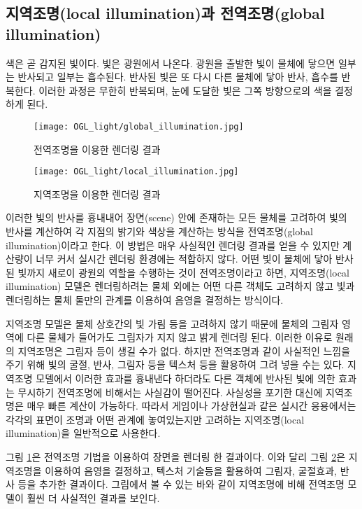 \subsection{지역조명(local illumination)과 전역조명(global illumination)}

색은 곧 감지된 빛이다. 빛은 광원에서 나온다. 광원을 출발한 빛이 물체에 닿으면 일부는 반사되고 일부는 흡수된다. 반사된 빛은 또 다시 다른 물체에 닿아 반사, 흡수를 반복한다. 이러한 과정은 무한히 반복되며, 눈에 도달한 빛은 그쪽 방향으로의 색을 결정하게 된다.


\begin{figure}[h!]
  \centering
    \texttt{[image: OGL\_light/global\_illumination.jpg]}
    \caption{전역조명을 이용한 렌더링 결과}
    \label{fig:OGL_light:global_illumination}
\end{figure}

\begin{figure}[h!]
  \centering
    \texttt{[image: OGL\_light/local\_illumination.jpg]}
    \caption{지역조명을 이용한 렌더링 결과}
    \label{fig:OGL_light:local_illumination}
\end{figure}

이러한 빛의 반사를 흉내내어 장면(scene) 안에 존재하는 모든 물체를 고려하여 빛의 반사를 계산하여 각 지점의 밝기와 색상을 계산하는 방식을 전역조명(global illumination)이라고 한다. 이 방법은 매우 사실적인 렌더링 결과를 얻을 수 있지만 계산량이 너무 커서 실시간 렌더링 환경에는 적합하지 않다.
어떤 빛이 물체에 닿아 반사된 빛까지 새로이 광원의 역할을 수행하는 것이 전역조명이라고 하면, 지역조명(local illumination) 모델은 렌더링하려는 
물체 외에는 어떤 다른 객체도 고려하지 않고 빛과 렌더링하는 물체 둘만의 관계를 이용하여 음영을 결정하는 방식이다. 


지역조명 모델은 물체 상호간의 빛 가림 등을 고려하지 않기 때문에 물체의 그림자 영역에 다른 물체가 들어가도 그림자가 지지 않고 밝게 렌더링 된다. 
이러한 이유로 원래의 지역조명은 그림자 등이 생길 수가 없다.
하지만 전역조명과 같이 사실적인 느낌을 주기 위해 빛의 굴절, 반사, 그림자 등을 텍스처 등을 활용하여 그려 넣을 수는 있다.
지역조명 모델에서 이러한 효과를 흉내낸다 하더라도 다른 객체에 반사된 빛에 의한 효과는 무시하기 전역조명에 비해서는
사실감이 떨어진다.
사실성을 포기한 대신에 지역조명은 매우 빠른 계산이 가능하다. 
따라서 게임이나 가상현실과 같은 실시간 응용에서는 각각의 표면이 조명과 어떤 관계에 놓여있는지만 고려하는 지역조명(local illumination)을 일반적으로 사용한다.


그림 \ref{fig:OGL_light:global_illumination}은 전역조명 기법을 이용하여 장면을 렌더링 한 결과이다. 이와 달리
그림 \ref{fig:OGL_light:local_illumination}은 지역조명을 이용하여 음영을 결정하고, 
텍스처 기술등을 활용하여 그림자, 굴절효과, 반사 등을 추가한 결과이다.
그림에서 볼 수 있는 바와 같이 지역조명에 비해 전역조명 모델이 훨씬 더 사실적인 결과를 보인다.

